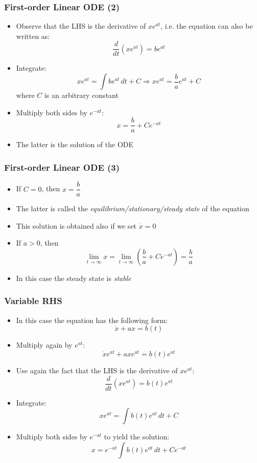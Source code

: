 \documentclass[10pt,usenames,dvipsnames]{beamer}
\theoremstyle{definition}
\begin{document}
\begin{frame}[fragile]
\frametitle{First-order Linear ODE (2)}
\begin{itemize}
	\item Observe that the LHS is the derivative of $xe^{at}$, i.e. the equation can also be written as:
	\[
		\dfrac{d}{dt}(xe^{at}) = be^{at}
	\]
	\item Integrate:
	\[
		xe^{at} = \int be^{at}\, dt + C \Rightarrow xe^{at} = \dfrac{b}{a}e^{at} + C
	\]
	where $C$ is an arbitrary constant
	\item Multiply both sides by $e^{-at}$:
	\[
		x = \dfrac{b}{a} + Ce^{-at}
	\]
	\item The latter is the solution of the ODE
\end{itemize}
\end{frame}

\begin{frame}[fragile]
\frametitle{First-order Linear ODE (3)}
\begin{itemize}
	\item If $C = 0$, then $\displaystyle x = \dfrac{b}{a}$
	\item The latter is called the \textit{equilibrium/stationary/steady state} of the equation
	\item This solution is obtained also if we set $\dot{x} = 0$
	\item If $a > 0$, then
	\[
		\lim_{t\to\infty}x = \lim_{t\to\infty}\left(\dfrac{b}{a} + Ce^{-at}\right) = \dfrac{b}{a}
	\]
	\item In this case the steady state is \textit{stable}
\end{itemize}
\end{frame}

\begin{frame}[fragile]
\frametitle{Variable RHS}
\begin{itemize}
	\item In this case the equation has the following form:
	\[
		\dot{x} + ax = b(t)
	\]
	\item Multiply again by $e^{at}$:
	\[
		\dot{x}e^{at} + axe^{at} = b(t)e^{at}
	\]
	\item Use again the fact that the LHS is the derivative of $xe^{at}$:
	\[
		\dfrac{d}{dt}(xe^{at}) = b(t)e^{at}
	\]
	\item Integrate:
	\[
		xe^{at} = \int b(t)e^{at}\, dt + C 
	\]
	\item Multiply both sides by $e^{-at}$ to yield the solution:
	\[
		x = e^{-at}\int b(t)e^{at}\, dt + C e^{-at}
	\]
\end{itemize}
\end{frame}
\end{document}
